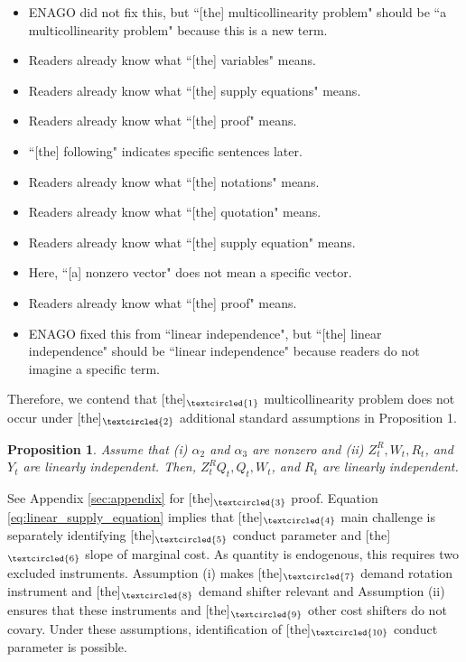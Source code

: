 \documentclass[11pt, a4paper]{article}
\newtheorem{proposition}{Proposition}
\begin{document}
\begin{itemize}
    \item[\textcircled{1}] ENAGO did not fix this, but ``[the] multicollinearity problem" should be ``a multicollinearity problem"  because this is a new term.
    \item[\textcircled{2}] Readers already know what ``[the] variables"  means.
    \item[\textcircled{3}] Readers already know what ``[the] supply equations"  means.
    \item[\textcircled{4}] Readers already know what ``[the] proof"  means.
    \item[\textcircled{5}] ``[the] following" indicates specific sentences later.
    \item[\textcircled{6}] Readers already know what ``[the] notations"  means.
    \item[\textcircled{7}] Readers already know what ``[the] quotation"  means.
    \item[\textcircled{8}] Readers already know what ``[the] supply equation"  means.
    \item[\textcircled{9}] Here, ``[a] nonzero vector"  does not mean a specific vector.
    \item[\textcircled{10}] Readers already know what ``[the] proof"  means.
    \item[\textcircled{11}] ENAGO fixed this from ``linear independence", but ``[the] linear independence" should be ``linear independence" because readers do not imagine a specific term.
\end{itemize}

\newpage
[paragraph 3,4,5]


Therefore, we contend that [the]$_{\textcircled{1}}$ multicollinearity problem does not occur under [the]$_{\textcircled{2}}$ additional standard assumptions in Proposition 1.
\begin{proposition}
    Assume that (i) $\alpha_2$ and $\alpha_3$ are nonzero and (ii) $Z^R_t, W_t, R_t$, and $Y_t$ are linearly independent.
    Then, $Z^{R}_{t}Q_{t}, Q_{t}, W_{t}$, and $R_{t}$ are linearly independent.
\end{proposition}

See Appendix \ref{sec:appendix} for [the]$_{\textcircled{3}}$ proof.
Equation \eqref{eq:linear_supply_equation} implies that [the]$_{\textcircled{4}}$ main challenge is separately identifying [the]$_{\textcircled{5}}$ conduct parameter and [the]$_{\textcircled{6}}$ slope of marginal cost.
As quantity is endogenous, this requires two excluded instruments. 
Assumption (i) makes [the]$_{\textcircled{7}}$ demand rotation instrument and [the]$_{\textcircled{8}}$ demand shifter relevant and Assumption (ii) ensures that these instruments and [the]$_{\textcircled{9}}$ other cost shifters do not covary.
Under these assumptions, identification of [the]$_{\textcircled{10}}$ conduct parameter is possible.
\end{document}
